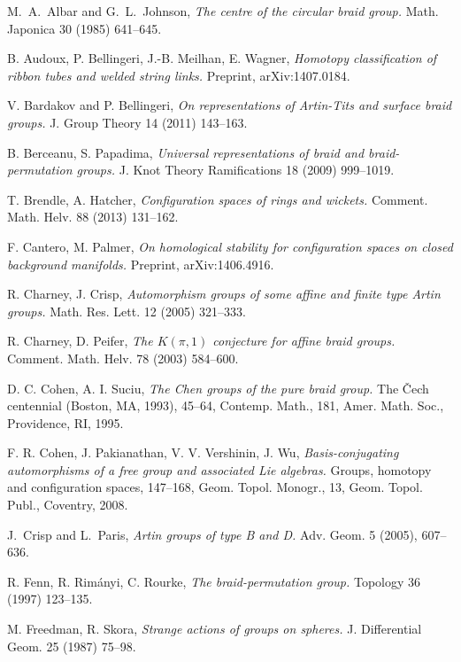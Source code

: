\documentclass[11pt]{amsart}
\begin{document}
\begin{thebibliography}{99}

M.~A.~Albar and G.~L.~Johnson, 
\emph{The centre of the circular braid group.} 
Math. Japonica 30 (1985) 641--645.

 B. Audoux, P. Bellingeri, J.-B. Meilhan, E. Wagner,  
\emph{Homotopy classification of ribbon tubes and welded string links.} 
Preprint, arXiv:1407.0184.
  
  
 V. Bardakov and P. Bellingeri, 
\emph{On representations of Artin-Tits and surface braid groups.} 
J. Group Theory 14 (2011) 143--163. 

 

 B. Berceanu, S. Papadima, 
\emph{Universal representations of braid and braid-permutation groups.}
J. Knot Theory Ramifications 18 (2009) 999--1019.

 T. Brendle, A. Hatcher, 
\emph{Configuration spaces of rings and wickets.}
Comment. Math. Helv. 88 (2013) 131--162.

 F. Cantero, M. Palmer,
\emph{On  homological  stability  for  configuration
spaces  on  closed  background  manifolds.}
Preprint, arXiv:1406.4916.

 R. Charney, J. Crisp,
\emph{Automorphism groups of some affine and finite type Artin groups.}
Math. Res. Lett. 12 (2005) 321--333.

 R. Charney, D. Peifer, 
\emph{The $K(\pi,1)$ conjecture for affine braid groups.}
Comment. Math. Helv. 78 (2003) 584--600.

 D. C.  Cohen, A. I.  Suciu, 
\emph{The Chen groups of the pure braid group.}
The \v{C}ech centennial (Boston, MA, 1993), 45--64, Contemp. Math., 181,
Amer. Math. Soc., Providence, RI, 1995.

 F. R. Cohen, J. Pakianathan, V. V. Vershinin, J. Wu, 
\emph{Basis-conjugating automorphisms of a free group and associated Lie algebras.}
Groups, homotopy and configuration spaces, 147--168, Geom. Topol. Monogr., 13, Geom. Topol. Publ., Coventry, 2008.

J.~Crisp and L.~Paris,
\emph{Artin groups of type B and D.} 
Adv. Geom. 5 (2005), 607--636.

 R. Fenn, R. Rim\'anyi, C. Rourke, 
\emph{The braid-permutation group.}
Topology 36 (1997) 123--135.

 M. Freedman, R. Skora, 
\emph{Strange actions of groups on spheres.}
J. Differential Geom. 25 (1987) 75--98.


\end{thebibliography}
\end{document}
